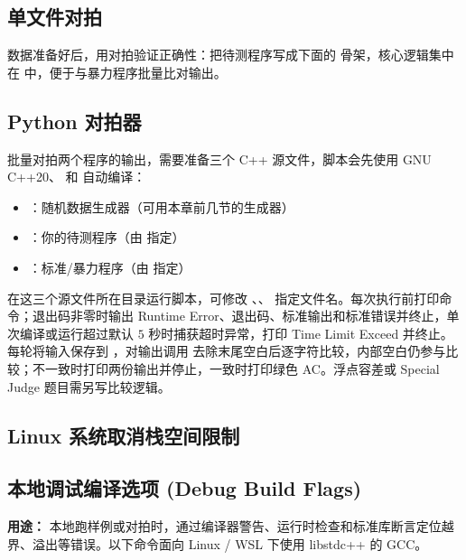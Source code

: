 

\subsection{单文件对拍}

数据准备好后，用对拍验证正确性：把待测程序写成下面的  骨架，核心逻辑集中在  中，便于与暴力程序批量比对输出。



\subsection{Python 对拍器}

批量对拍两个程序的输出，需要准备三个 C++ 源文件，脚本会先使用 GNU C++20、 和  自动编译：
\begin{itemize}
    \item {}：随机数据生成器（可用本章前几节的生成器）
    \item {}：你的待测程序（由  指定）
    \item {}：标准/暴力程序（由  指定）
\end{itemize}

在这三个源文件所在目录运行脚本，可修改 、、 指定文件名。每次执行前打印命令；退出码非零时输出 Runtime Error、退出码、标准输出和标准错误并终止，单次编译或运行超过默认 $5$ 秒时捕获超时异常，打印 Time Limit Exceed 并终止。每轮将输入保存到 ，对输出调用  去除末尾空白后逐字符比较，内部空白仍参与比较；不一致时打印两份输出并停止，一致时打印绿色 AC。浮点容差或 Special Judge 题目需另写比较逻辑。



\subsection{Linux 系统取消栈空间限制}



\subsection{本地调试编译选项 (Debug Build Flags)}

\textbf{用途：} 本地跑样例或对拍时，通过编译器警告、运行时检查和标准库断言定位越界、溢出等错误。以下命令面向 Linux / WSL 下使用 libstdc++ 的 GCC。

